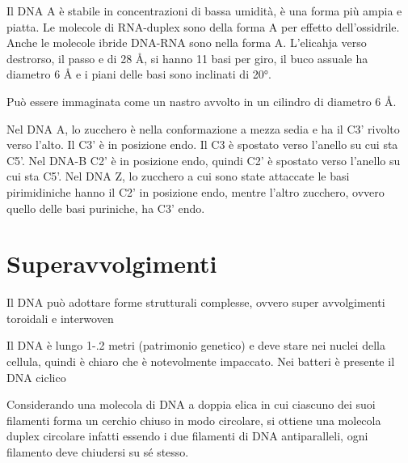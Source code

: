 
Il DNA A è stabile in concentrazioni di bassa umidità, è una forma più ampia e piatta. Le molecole di RNA-duplex sono della forma A per effetto dell'ossidrile. Anche le molecole ibride DNA-RNA sono nella forma A. L'elicahja verso destrorso, il passo e di 28 \AA, si hanno 11 basi per giro, il buco assuale ha diametro 6 \AA{} e i piani delle basi sono inclinati di 20°.

Può essere immaginata come un nastro avvolto in un cilindro di diametro 6 \AA.

Nel DNA A, lo zucchero è nella conformazione a mezza sedia e ha il C3' rivolto verso l'alto. Il C3' è in posizione endo. Il C3 è spostato verso l'anello su cui sta C5'. Nel DNA-B C2' è in posizione endo, quindi C2' è spostato verso l'anello su cui sta C5'. Nel DNA Z, lo zucchero a cui sono state attaccate le basi pirimidiniche hanno il C2' in posizione endo, mentre l'altro zucchero, ovvero quello delle basi puriniche, ha C3' endo.


\clearpage

\section{Superavvolgimenti}

Il DNA può adottare forme strutturali complesse, ovvero super avvolgimenti toroidali e interwoven


Il DNA è lungo 1-.2 metri (patrimonio genetico) e deve stare nei nuclei della cellula, quindi è chiaro che è notevolmente impaccato. Nei batteri è presente il DNA ciclico

Considerando una molecola di DNA a doppia elica in cui ciascuno dei suoi filamenti forma un cerchio chiuso in modo circolare, si ottiene una molecola duplex circolare infatti essendo i due filamenti di DNA antiparalleli, ogni filamento deve chiudersi su sé stesso.

